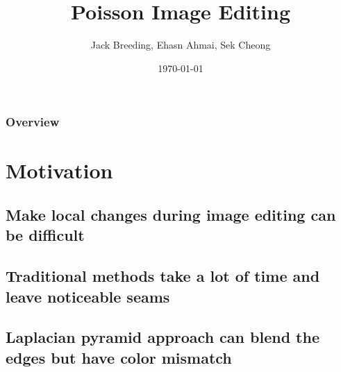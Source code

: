 \documentclass{beamer}
\title[]{Poisson Image Editing} %
\author{Jack Breeding, Ehasn Ahmai, Sek Cheong} %
\institute[UW] %
{
University of Wisconsin, Madison \\ %
\medskip
\textit{\{jbreeding,eahmadi2, sucheong\}@wisc.com} %
}
\date{\today} %
\begin{document}
\begin{frame}
\titlepage %
\end{frame}

\begin{frame}
\frametitle{Overview} 
\tableofcontents 
\end{frame}



\section{Motivation} 

\subsection{Make local changes during image editing can be difficult}
\subsection{Traditional methods take a lot of time and leave noticeable seams}
\subsection{Laplacian pyramid approach can blend the edges but have color mismatch}
\end{document}
